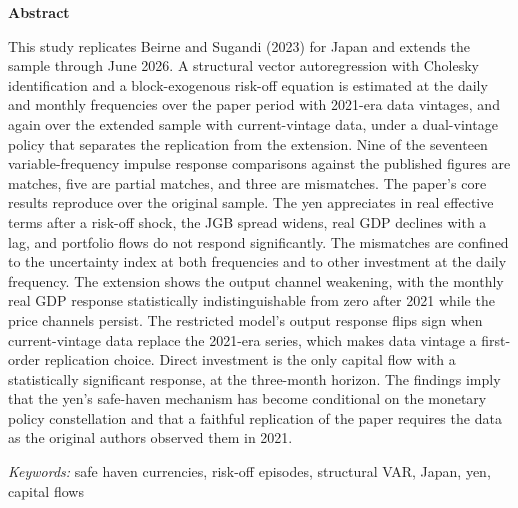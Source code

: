 \documentclass[12pt]{article}
\begin{document}
\newpage
\thispagestyle{empty}
\begin{center}
  {\large \textbf{Abstract}}
\end{center}

\vspace{0.8em}

This study replicates Beirne and Sugandi (2023) for Japan and extends the sample through June 2026. A structural vector autoregression with Cholesky identification and a block-exogenous risk-off equation is estimated at the daily and monthly frequencies over the paper period with 2021-era data vintages, and again over the extended sample with current-vintage data, under a dual-vintage policy that separates the replication from the extension. Nine of the seventeen variable-frequency impulse response comparisons against the published figures are matches, five are partial matches, and three are mismatches. The paper's core results reproduce over the original sample. The yen appreciates in real effective terms after a risk-off shock, the JGB spread widens, real GDP declines with a lag, and portfolio flows do not respond significantly. The mismatches are confined to the uncertainty index at both frequencies and to other investment at the daily frequency. The extension shows the output channel weakening, with the monthly real GDP response statistically indistinguishable from zero after 2021 while the price channels persist. The restricted model's output response flips sign when current-vintage data replace the 2021-era series, which makes data vintage a first-order replication choice. Direct investment is the only capital flow with a statistically significant response, at the three-month horizon. The findings imply that the yen's safe-haven mechanism has become conditional on the monetary policy constellation and that a faithful replication of the paper requires the data as the original authors observed them in 2021.

\vspace{1em}
\noindent\textit{Keywords:} safe haven currencies, risk-off episodes, structural VAR, Japan, yen, capital flows

\newpage
\tableofcontents
\newpage


\clearpage

\clearpage

\clearpage

\clearpage

\clearpage


\clearpage
\printbibliography[title={References}]

\appendix
\clearpage

\end{document}

